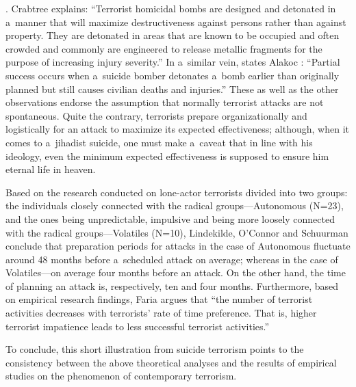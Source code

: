 \parencites[see][p.25]{}[][]{}. %
 Crabtree 
\parencite*[][p.577]{} %
 explains: ``Terrorist homicidal bombs are designed and detonated in a~manner that will maximize destructiveness against persons rather than against property. They are detonated in areas that are known to be occupied and often crowded and commonly are engineered to release metallic fragments for the purpose of increasing injury severity.'' In a~similar vein, states Alakoc 
\parencite*[][p.6]{}: %
 ``Partial success occurs when a~suicide bomber detonates a~bomb earlier than originally planned but still causes civilian deaths and injuries.'' These as well as the other observations endorse the assumption that normally terrorist attacks are not spontaneous. Quite the contrary, terrorists prepare organizationally and logistically for an attack to maximize its expected effectiveness; although, when it comes to a~jihadist suicide, one must make a~caveat that in line with his ideology, even the minimum expected effectiveness is supposed to ensure him eternal life in heaven.



Based on the research conducted on lone-actor terrorists divided into two groups: the individuals closely connected with the radical groups---Autonomous (N=23), and the ones being unpredictable, impulsive and being more loosely connected with the radical groups---Volatiles (N=10), Lindekilde, O'Connor and Schuurman 
\parencite*[][p.126]{} %
 conclude that preparation periods for attacks in the case of Autonomous fluctuate around 48 months before a~scheduled attack on average; whereas in the case of Volatiles---on average four months before an attack. On the other hand, the time of planning an attack is, respectively, ten and four months. Furthermore, based on empirical research findings, Faria 
\parencite*[][]{} %
 argues that ``the number of terrorist activities decreases with terrorists' rate of time preference. That is, higher terrorist impatience leads to less successful terrorist activities.''



To conclude, this short illustration from suicide terrorism points to the consistency between the above theoretical analyses and the results of empirical studies on the phenomenon of contemporary terrorism.



